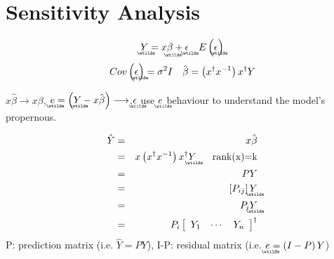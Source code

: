 \documentclass{article}
\begin{document}
\setcounter{part}{6} \setcounter{page}{38}

\bigskip

\part{Sensitivity Analysis}

\begin{equation*}
\underaccent{\wtilde}{Y}%
=x%
\underaccent{\wtilde}{\beta}%
+%
\underaccent{\wtilde}{\epsilon}%
\quad E\left( 
\underaccent{\wtilde}{\epsilon}%
\right)
\end{equation*}%
\begin{equation*}
Cov\left( 
\underaccent{\wtilde}{\epsilon}%
\right) =\sigma ^{2}I\quad \hat{\beta}=\left( x^{\dagger }x^{-1}\right)
x^{\dagger }Y
\end{equation*}

$x\hat{\beta}\longrightarrow x\beta $, $%
\underaccent{\wtilde}{e}%
=\left( 
\underaccent{\wtilde}{Y}%
-x\hat{\beta}\right) \longrightarrow $,$%
\underaccent{\wtilde}{\epsilon}%
$ use $%
\underaccent{\wtilde}{e}%
$ behaviour to understand the model's propernous.

\begin{eqnarray*}
\hat{Y} &=&x\hat{\beta} \\
&=&x\left( x^{\dagger }x^{-1}\right) x^{\dagger }%
\underaccent{\wtilde}{Y}%
\quad \text{rank(x)=k} \\
&=&PY \\
&=&\left[ P_{ij}\right] 
\underaccent{\wtilde}{Y}
\\
&=&P_{i}%
\underaccent{\wtilde}{Y}
\\
&=&P_{i}\left[ 
\begin{array}{ccc}
Y_{1} & \cdots & Y_{n}%
\end{array}%
\right] ^{\dagger }
\end{eqnarray*}%
P: prediction matrix (i.e. $\hat{Y}=PY$), I-P: residual matrix (i.e. $%
\underaccent{\wtilde}{e}%
=\left( I-P\right) Y$)
\end{document}
